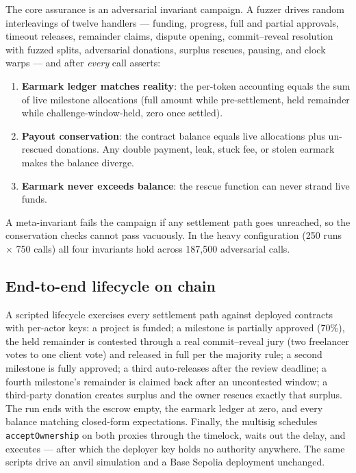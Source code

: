 \documentclass[11pt,letterpaper]{article}
\begin{document}
The core assurance is an adversarial invariant campaign. A fuzzer drives random
interleavings of twelve handlers --- funding, progress, full and partial approvals,
timeout releases, remainder claims, dispute opening, commit--reveal resolution with
fuzzed splits, adversarial donations, surplus rescues, pausing, and clock warps ---
and after \emph{every} call asserts:

\begin{enumerate}
\item \textbf{Earmark ledger matches reality}: the per-token accounting equals the
sum of live milestone allocations (full amount while pre-settlement, held remainder
while challenge-window-held, zero once settled).
\item \textbf{Payout conservation}: the contract balance equals live allocations plus
un-rescued donations. Any double payment, leak, stuck fee, or stolen earmark makes
the balance diverge.
\item \textbf{Earmark never exceeds balance}: the rescue function can never strand
live funds.
\end{enumerate}

A meta-invariant fails the campaign if any settlement path goes unreached, so the
conservation checks cannot pass vacuously. In the heavy configuration (250 runs
$\times$ 750 calls) all four invariants hold across 187{,}500 adversarial calls.

\subsection{End-to-end lifecycle on chain}

A scripted lifecycle exercises every settlement path against deployed contracts with
per-actor keys: a project is funded; a milestone is partially approved (70\%), the
held remainder is contested through a real commit--reveal jury (two freelancer votes
to one client vote) and released in full per the majority rule; a second milestone is
fully approved; a third auto-releases after the review deadline; a fourth milestone's
remainder is claimed back after an uncontested window; a third-party donation creates
surplus and the owner rescues exactly that surplus. The run ends with the escrow
empty, the earmark ledger at zero, and every balance matching closed-form
expectations. Finally, the multisig schedules \texttt{acceptOwnership} on both
proxies through the timelock, waits out the delay, and executes --- after which the
deployer key holds no authority anywhere. The same scripts drive an anvil simulation
and a Base Sepolia deployment unchanged.
\end{document}
